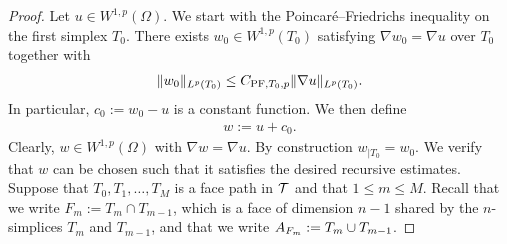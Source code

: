 \documentclass[10pt,a4paper]{article}
\begin{document}
\begin{proof}
    Let $u \in W^{1,p}(\Omega)$. 
    We start with the Poincar\'e--Friedrichs inequality on the first simplex $T_{0}$. 
    There exists $w_0 \in W^{1,p}(T_{0})$ satisfying $\nabla w_0 = \nabla u$ over $T_{0}$ together with 
    \begin{gather*}
        \| w_0 \|_{L^{p}(T_{0})} \leq C_{{{\rm PF}},T_{0},p} \| \nabla u \|_{L^{p}(T_{0})}.
    \end{gather*}
    In particular, $c_{0} := w_0 - u$ is a constant function. 
    We then define 
    \begin{align*}
        w := u + c_0
        .
    \end{align*} 
    Clearly, $w \in W^{1,p}(\Omega)$ with $\nabla w = \nabla u$.
    By construction $w_{|T_{0}} = w_0$. 
    We verify that $w$ can be chosen such that it satisfies the desired recursive estimates.
    Suppose that $T_0, T_1, \dots, T_M$ is a face path in ${\mathcal T}$
    and that $1 \leq m \leq M$.
    Recall that we write $F_m := T_m \cap T_{m-1}$, which is a face of dimension $n-1$ shared by the $n$-simplices $T_{m}$ and $T_{m-1}$,
    and that we write $A_{F_m} := T_m \cup T_{m-1}$. 
    

\end{proof}
\end{document}

